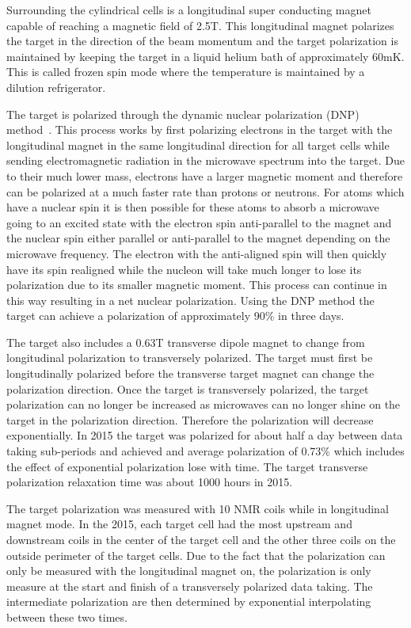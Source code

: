 Surrounding the cylindrical cells is a longitudinal super conducting magnet
capable of reaching a magnetic field of 2.5T.  This longitudinal magnet
polarizes the target in the direction of the beam momentum and the target
polarization is maintained by keeping the target in a liquid helium bath of
approximately 60mK.  This is called frozen spin mode where the temperature is
maintained by a dilution refrigerator. \par

The target is polarized through the dynamic nuclear polarization (DNP)
method~\cite{DNPmethod}.  This process works by first polarizing electrons in
the target with the longitudinal magnet in the same longitudinal direction for
all target cells while sending electromagnetic radiation in the microwave
spectrum into the target.  Due to their much lower mass, electrons have a larger
magnetic moment and therefore can be polarized at a much faster rate than
protons or neutrons.  For atoms which have a nuclear spin it is then possible
for these atoms to absorb a microwave going to an excited state with the
electron spin anti-parallel to the magnet and the nuclear spin either parallel
or anti-parallel to the magnet depending on the microwave frequency.  The
electron with the anti-aligned spin will then quickly have its spin realigned
while the nucleon will take much longer to lose its polarization due to its
smaller magnetic moment.  This process can continue in this way resulting in a
net nuclear polarization.  Using the DNP method the target can achieve a
polarization of approximately 90\% in three days. \par

The target also includes a 0.63T transverse dipole magnet to change from
longitudinal polarization to transversely polarized.  The target must first be
longitudinally polarized before the transverse target magnet can change the
polarization direction.  Once the target is transversely polarized, the target
polarization can no longer be increased as microwaves can no longer shine on the
target in the polarization direction.  Therefore the polarization will decrease
exponentially.  In 2015 the target was polarized for about half a day between
data taking sub-periods and achieved and average polarization of 0.73\% which
includes the effect of exponential polarization lose with time.  The target
transverse polarization relaxation time was about 1000 hours in 2015. \par

The target polarization was measured with 10 NMR coils while in longitudinal
magnet mode.  In the 2015, each target cell had the most upstream and downstream
coils in the center of the target cell and the other three coils on the outside
perimeter of the target cells.  Due to the fact that the polarization can only
be measured with the longitudinal magnet on, the polarization is only measure at
the start and finish of a transversely polarized data taking.  The intermediate
polarization are then determined by exponential interpolating between these two
times.


